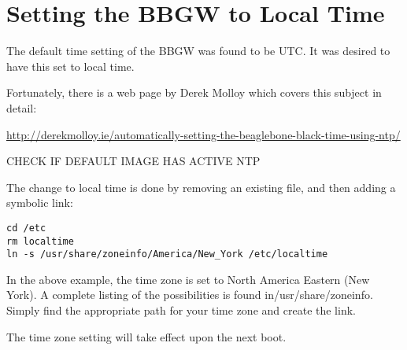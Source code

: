 \chapter{Setting the BBGW to Local Time}

The default time setting of the BBGW was found to be UTC.  It was desired to 
have this set to local time.

Fortunately, there is a web page by Derek Molloy which covers this subject in 
detail:

\url{http://derekmolloy.ie/automatically-setting-the-beaglebone-black-time-using-ntp/}

CHECK IF DEFAULT IMAGE HAS ACTIVE NTP

The change to local time is done by removing an existing file, and then adding 
a symbolic link:

\begin{verbatim}
cd /etc
rm localtime
ln -s /usr/share/zoneinfo/America/New_York /etc/localtime
\end{verbatim}

In the above example, the time zone is set to North America Eastern (New 
York).  A complete listing of the possibilities is found in/usr/share/zoneinfo.
Simply find the appropriate path for your time zone and create the link.

The time zone setting will take effect upon the next boot.
